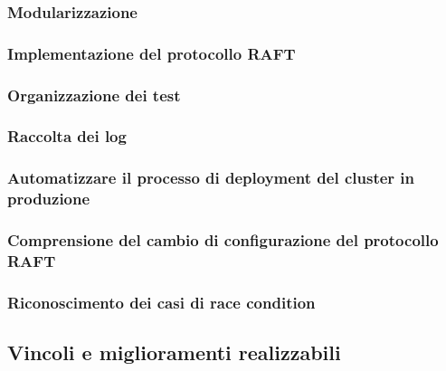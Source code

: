 \documentclass[a4paper]{article}
\begin{document}
\subsubsection{Modularizzazione}

\subsubsection{Implementazione del protocollo RAFT}

\subsubsection{Organizzazione dei test}

\subsubsection{Raccolta dei log}

\subsubsection{Automatizzare il processo di deployment del cluster in produzione}

\subsubsection{Comprensione del cambio di configurazione del protocollo RAFT}

\subsubsection{Riconoscimento dei casi di race condition}

\subsection{Vincoli e miglioramenti realizzabili}
\end{document}
